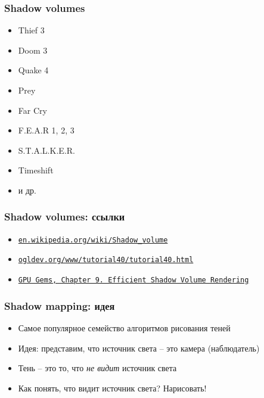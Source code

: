 \documentclass[10pt]{beamer}
\begin{document}
\begin{frame}[fragile]
\frametitle{Shadow volumes}
\begin{itemize}
\item Thief 3
\item Doom 3
\item Quake 4
\item Prey
\item Far Cry
\item F.E.A.R 1, 2, 3
\item S.T.A.L.K.E.R.
\item Timeshift
\item и др.
\end{itemize}
\end{frame}

\begin{frame}[fragile]
\frametitle{Shadow volumes: ссылки}
\begin{itemize}
\item \href{https://en.wikipedia.org/wiki/Shadow_volume}{\nolinkurl{en.wikipedia.org/wiki/Shadow\_volume}}
\item \href{https://ogldev.org/www/tutorial40/tutorial40.html}{\nolinkurl{ogldev.org/www/tutorial40/tutorial40.html}}
\item \href{https://developer.nvidia.com/gpugems/gpugems/part-ii-lighting-and-shadows/chapter-9-efficient-shadow-volume-rendering}{\texttt{GPU Gems, Chapter 9. Efficient Shadow Volume Rendering}}
\end{itemize}
\end{frame}

\begin{frame}[fragile]
\frametitle{Shadow mapping: идея}
\begin{itemize}
\item Самое популярное семейство алгоритмов рисования теней
\pause
\item Идея: представим, что источник света -- это камера (наблюдатель)
\item Тень -- это то, что \textit{не видит} источник света
\pause
\item Как понять, что видит источник света? \pause Нарисовать!
\end{itemize}
\end{frame}
\end{document}
